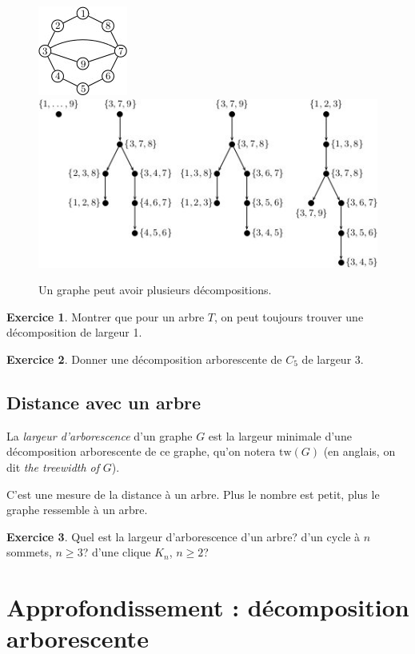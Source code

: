 \documentclass[a4paper,12pt]{article}
\theoremstyle{definition}
\newtheorem{exo}{Exercice}%
\theoremstyle{remark}
\newcommand{\tw}[1]{\ensuremath{\mathrm{tw}(#1)}}
\begin{document}
\begin{figure}[h]
  \centering
  \begin{center}
    \includegraphics[height=.15\textwidth]{dessins/grapheExoGrohe.jpg}
    \quad 
    \includegraphics[height=.3\textwidth]{dessins/grapheExoGroheVariousDecompositions.jpg}
  \end{center}
  \caption{Un graphe peut avoir plusieurs décompositions.}
  \label{fig:1graphePlusieursDecomp}
\end{figure}

\begin{exo}
  Montrer que pour un arbre $T$, on peut toujours trouver une
  décomposition de largeur 1.
\end{exo}

\begin{exo}
  Donner une décomposition arborescente de $C_5$ de largeur 3.
\end{exo}

\subsection*{Distance avec un arbre}
\label{sec:distance-avec-un}

La \emph{largeur d'arborescence} d'un graphe $G$ est la largeur minimale
d'une décomposition arborescente de ce graphe, qu'on notera $\tw{G}$
(en anglais, on dit \textsl{the treewidth of} $G$). 

C'est une mesure de la distance à un arbre. Plus le nombre est petit,
plus le graphe ressemble à un arbre.

\begin{exo}
  Quel est la largeur d'arborescence d'un arbre? d'un cycle à $n$
  sommets, $n\geq 3$? d'une clique $K_n$, $n\geq 2$?
\end{exo}

\section{Approfondissement : décomposition arborescente}
\end{document}
